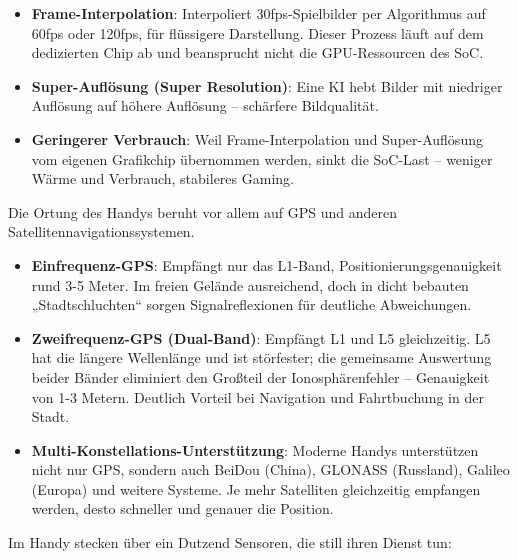 \begin{itemize}
  \item \textbf{Frame-Interpolation}: Interpoliert 30fps-Spielbilder per Algorithmus auf 60fps oder 120fps, für flüssigere Darstellung. Dieser Prozess läuft auf dem dedizierten Chip ab und beansprucht nicht die GPU-Ressourcen des SoC.
  \item \textbf{Super-Auflösung (Super Resolution)}: Eine KI hebt Bilder mit niedriger Auflösung auf höhere Auflösung – schärfere Bildqualität.
  \item \textbf{Geringerer Verbrauch}: Weil Frame-Interpolation und Super-Auflösung vom eigenen Grafikchip übernommen werden, sinkt die SoC-Last – weniger Wärme und Verbrauch, stabileres Gaming.
\end{itemize}


Die Ortung des Handys beruht vor allem auf GPS und anderen Satellitennavigationssystemen.

\begin{itemize}
  \item \textbf{Einfrequenz-GPS}: Empfängt nur das L1-Band, Positionierungsgenauigkeit rund 3-5 Meter. Im freien Gelände ausreichend, doch in dicht bebauten „Stadtschluchten“ sorgen Signalreflexionen für deutliche Abweichungen.
  \item \textbf{Zweifrequenz-GPS (Dual-Band)}: Empfängt L1 und L5 gleichzeitig. L5 hat die längere Wellenlänge und ist störfester; die gemeinsame Auswertung beider Bänder eliminiert den Großteil der Ionosphärenfehler – Genauigkeit von 1-3 Metern. Deutlich Vorteil bei Navigation und Fahrtbuchung in der Stadt.
  \item \textbf{Multi-Konstellations-Unterstützung}: Moderne Handys unterstützen nicht nur GPS, sondern auch BeiDou (China), GLONASS (Russland), Galileo (Europa) und weitere Systeme. Je mehr Satelliten gleichzeitig empfangen werden, desto schneller und genauer die Position.
\end{itemize}


Im Handy stecken über ein Dutzend Sensoren, die still ihren Dienst tun:

